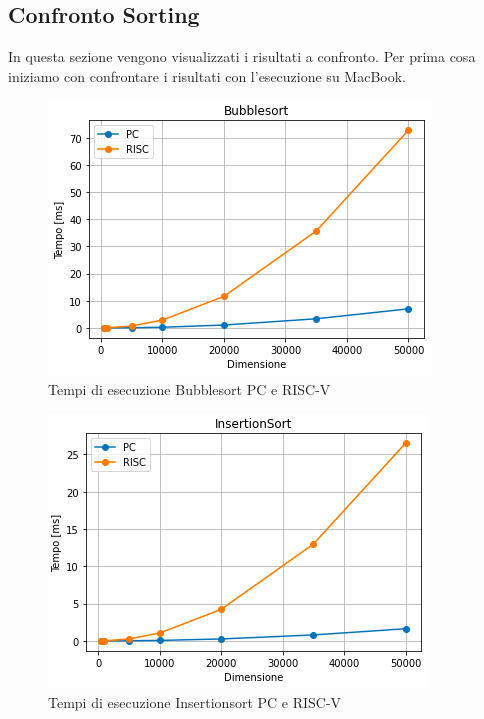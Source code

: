 \documentclass[12pt,a4paper]{report}
\begin{document}
\subsection{Confronto Sorting}
In questa sezione vengono visualizzati i risultati a confronto. Per prima cosa iniziamo con confrontare i risultati con l'esecuzione su MacBook.


\begin{figure}[ht]
\centering
         \includegraphics[scale=0.8]{Img/GraficiSorting/BubbleSort_Pc_Riscv.PNG}
         \caption{Tempi di esecuzione Bubblesort PC e RISC-V}
\end{figure}

\begin{figure}[ht]
\centering
         \includegraphics[scale=0.8]{Img/GraficiSorting/InsertionsortPcRisc.PNG}
         \caption{Tempi di esecuzione Insertionsort PC e RISC-V}
\end{figure}
	
\end{document}
